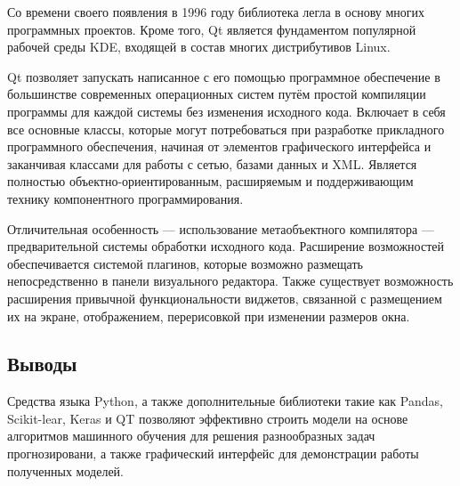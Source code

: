 Со времени своего появления в 1996 году библиотека легла в основу многих программных проектов. Кроме того, Qt является фундаментом популярной рабочей среды KDE, входящей в состав многих дистрибутивов Linux.

Qt позволяет запускать написанное с его помощью программное обеспечение в большинстве современных операционных систем путём простой компиляции программы для каждой системы без изменения исходного кода. Включает в себя все основные классы, которые могут потребоваться при разработке прикладного программного обеспечения, начиная от элементов графического интерфейса и заканчивая классами для работы с сетью, базами данных и XML. Является полностью объектно-ориентированным, расширяемым и поддерживающим технику компонентного программирования.

Отличительная особенность — использование метаобъектного компилятора — предварительной системы обработки исходного кода. Расширение возможностей обеспечивается системой плагинов, которые возможно размещать непосредственно в панели визуального редактора. Также существует возможность расширения привычной функциональности виджетов, связанной с размещением их на экране, отображением, перерисовкой при изменении размеров окна.

\subsection{Выводы}
Средства языка Python, а также дополнительные библиотеки такие как Pandas, Scikit-lear, Keras и QT позволяют эффективно строить модели на основе алгоритмов машинного обучения для решения разнообразных задач прогнозировани, а также графический интерфейс для демонстрации работы полученных моделей.

